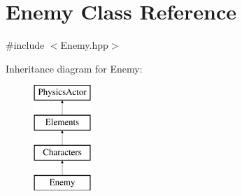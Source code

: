 \hypertarget{class_enemy}{\section{Enemy Class Reference}
\label{class_enemy}
}


{\ttfamily \#include $<$Enemy.\+hpp$>$}

Inheritance diagram for Enemy\+:\begin{figure}[H]
\begin{center}
\leavevmode
\includegraphics[height=4.000000cm]{class_enemy}
\end{center}
\end{figure}

